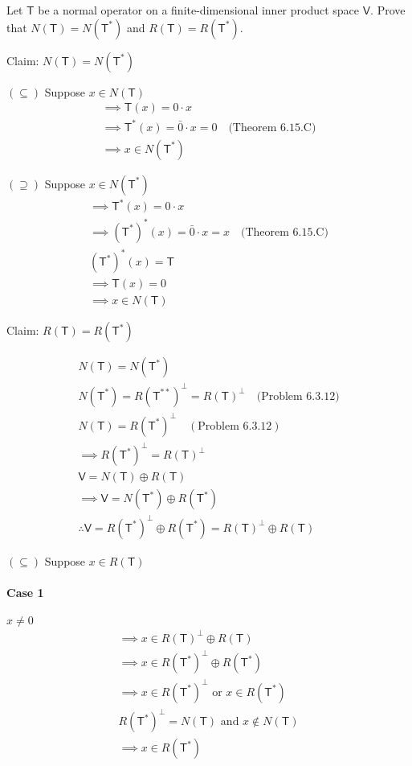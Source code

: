 Let $\mathsf{T}$ be a normal operator on a finite-dimensional inner
product space $\mathsf{V}.$ Prove that $N(\mathsf{T}) =
N(\mathsf{T}^*)$ and $R(\mathsf{T}) = R(\mathsf{T}^*).$

Claim:  $N(\mathsf{T}) = N(\mathsf{T}^*)$

$(\subseteq)$ Suppose $x \in N(\mathsf{T})$
\begin{gather}
\implies \mathsf{T}(x) = 0\cdot x\\
\implies \mathsf{T}^*(x) = \bar{0}\cdot x =0\quad\text{(Theorem 6.15.C)}\\ 
\implies x \in N(\mathsf{T}^*)
\end{gather}

$(\supseteq)$ Suppose $x \in N(\mathsf{T}^*)$
\begin{gather}
\implies \mathsf{T}^*(x) = 0 \cdot x\\
\implies \left(\mathsf{T}^*\right)^*(x) = \bar{0}\cdot x = x \quad\text{(Theorem 6.15.C)}\\
\left(\mathsf{T}^*\right)^*(x) = \mathsf{T}\\
\implies \mathsf{T}(x) = 0\\
\implies x \in N(\mathsf{T})
\end{gather}

Claim: $R(\mathsf{T}) = R(\mathsf{T}^*)$

\begin{gather}
N(\mathsf{T}) = N(\mathsf{T}^*)\\
N(\mathsf{T}^*) = R(\mathsf{T}^{**})^\perp = R(\mathsf{T})^\perp
\quad \text{(Problem 6.3.12)}\\
N(\mathsf{T}) = R(\mathsf{T}^*)^\perp \quad (\text{Problem 6.3.12})\\
\implies R(\mathsf{T}^*)^\perp = R(\mathsf{T})^\perp\\
\mathsf{V} =N(\mathsf{T})\oplus R(\mathsf{T}) \\
\implies \mathsf{V} = N(\mathsf{T}^*) \oplus R(\mathsf{T}^*)\\
\therefore \mathsf{V} = R(\mathsf{T}^*)^\perp \oplus R(\mathsf{T}^*) =
R(\mathsf{T})^\perp \oplus R(\mathsf{T})
\end{gather}

$(\subseteq)$ Suppose $x \in R(\mathsf{T})$
\paragraph{Case 1} $x \neq 0$
\begin{gather}
\implies x \in R(\mathsf{T})^\perp \oplus R(\mathsf{T})\\
\implies x \in R(\mathsf{T}^*)^\perp \oplus R(\mathsf{T}^*)\\
\implies x \in R(\mathsf{T}^*)^\perp \text{ or } x \in
R(\mathsf{T}^*)\\
R(\mathsf{T}^*)^\perp = N(\mathsf{T}) \text{ and } x \notin N(\mathsf{T})\\
\implies x \in R(\mathsf{T}^*)
\end{gather}

